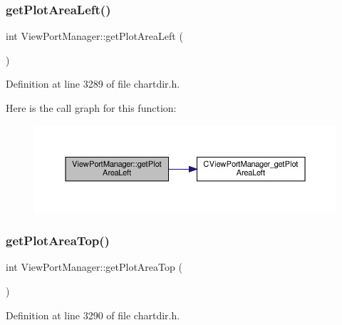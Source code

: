 \subsubsection{\texorpdfstring{get\+Plot\+Area\+Left()}{getPlotAreaLeft()}}
{\footnotesize\ttfamily int View\+Port\+Manager\+::get\+Plot\+Area\+Left (\begin{DoxyParamCaption}{ }\end{DoxyParamCaption})\hspace{0.3cm}{\ttfamily [inline]}}



Definition at line 3289 of file chartdir.\+h.

Here is the call graph for this function\+:
\nopagebreak
\begin{figure}[H]
\begin{center}
\leavevmode
\includegraphics[width=350pt]{class_view_port_manager_a244345729e7f3798f509031a72bf7362_cgraph}
\end{center}
\end{figure}
\mbox{\label{class_view_port_manager_a4f4797760398802b6cc12970f57e3039}} 
\subsubsection{\texorpdfstring{get\+Plot\+Area\+Top()}{getPlotAreaTop()}}
{\footnotesize\ttfamily int View\+Port\+Manager\+::get\+Plot\+Area\+Top (\begin{DoxyParamCaption}{ }\end{DoxyParamCaption})\hspace{0.3cm}{\ttfamily [inline]}}



Definition at line 3290 of file chartdir.\+h.

